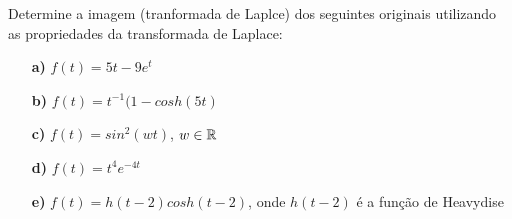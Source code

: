 \linespread{1.5}
Determine a imagem (tranformada de Laplce) dos seguintes originais utilizando as propriedades da transformada de Laplace:
\begin{itemize}
    \item[\textbf{a)}]$f(t) = 5t - 9e^t$
    \item[\textbf{b)}]$f(t) = t^{-1}(1-cosh(5t)$
    \item[\textbf{c)}]$f(t) = sin^2(wt)$, $w \in \mathbb{R}$
    \item[\textbf{d)}]$f(t) = t^4e^{-4t}$
    \item[\textbf{e)}]$f(t) = h(t-2)cosh(t-2)$, onde $h(t-2)$ é a função de Heavydise
    \end{itemize}
